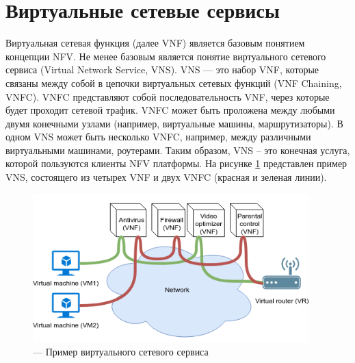 \documentclass[oneside,final,14pt,a4paper]{extreport}
\begin{document}
\section{Виртуальные сетевые сервисы}
\label{sec:vns}
Виртуальная сетевая функция (далее VNF) является базовым понятием концепции NFV. Не менее базовым является понятие виртуального сетевого сервиса (Virtual Network Service, VNS). VNS --- это набор VNF, которые связаны между собой в цепочки виртуальных сетевых функций (VNF Chaining, VNFC). VNFC представляют собой последовательность VNF, через которые будет проходит сетевой трафик. VNFC может быть проложена между любыми двумя конечными узлами (например, виртуальные машины, маршрутизаторы). В одном VNS может быть несколько VNFC, например, между различными виртуальными машинами, роутерами.
Таким образом, VNS -- это конечная услуга, которой пользуются клиенты NFV платформы. На рисунке \ref{pic:vns_example} представлен пример VNS, состоящего из четырех VNF и двух VNFC (красная и зеленая линии).

\begin{figure}[h]
	\centering
	\includegraphics[width=0.95\textwidth]{vnf_chaining_example}
	\caption{--- Пример виртуального сетевого сервиса}
	\label{pic:vns_example}
\end{figure}

\end{document}
